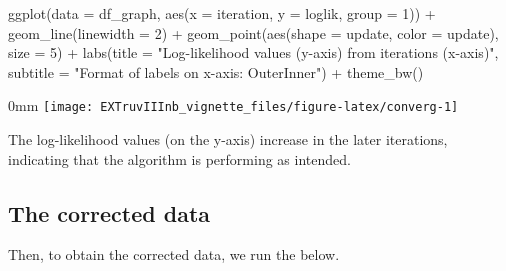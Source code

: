 \documentclass[]{article}
\newcommand{\hlnum}[1]{\textcolor[rgb]{0.816,0.125,0.439}{#1}}%
\newcommand{\hlstr}[1]{\textcolor[rgb]{0.251,0.627,0.251}{#1}}%
\newcommand{\hlstd}[1]{\textcolor[rgb]{0.251,0.251,0.251}{#1}}%
\newenvironment{Shaded}{\begin{myshaded}}{\end{myshaded}}
\newcommand{\DecValTok}[1]{\hlnum{#1}}
\newcommand{\SpecialCharTok}[1]{\hlstr{#1}}
\newcommand{\StringTok}[1]{\hlstr{#1}}
\newcommand{\FunctionTok}[1]{\hlstd{#1}}
\newcommand{\AttributeTok}[1]{{#1}}
\newcommand{\NormalTok}[1]{\hlstd{#1}}
\begin{document}
\begin{Shaded}
\begin{Highlighting}[]
\FunctionTok{ggplot}\NormalTok{(}\AttributeTok{data =}\NormalTok{ df\_graph, }\FunctionTok{aes}\NormalTok{(}\AttributeTok{x =}\NormalTok{ iteration, }\AttributeTok{y =}\NormalTok{ loglik, }\AttributeTok{group =} \DecValTok{1}\NormalTok{)) }\SpecialCharTok{+}
    \FunctionTok{geom\_line}\NormalTok{(}\AttributeTok{linewidth =} \DecValTok{2}\NormalTok{) }\SpecialCharTok{+} \FunctionTok{geom\_point}\NormalTok{(}\FunctionTok{aes}\NormalTok{(}\AttributeTok{shape =}\NormalTok{ update,}
    \AttributeTok{color =}\NormalTok{ update), }\AttributeTok{size =} \DecValTok{5}\NormalTok{) }\SpecialCharTok{+} \FunctionTok{labs}\NormalTok{(}\AttributeTok{title =} \StringTok{"Log{-}likelihood values (y{-}axis) from iterations (x{-}axis)"}\NormalTok{,}
    \AttributeTok{subtitle =} \StringTok{"Format of labels on x{-}axis: OuterInner"}\NormalTok{) }\SpecialCharTok{+} \FunctionTok{theme\_bw}\NormalTok{()}
\end{Highlighting}
\end{Shaded}

\begin{adjustwidth}{\fltoffset}{0mm}
\texttt{[image: EXTruvIIInb\_vignette\_files/figure-latex/converg-1]} \end{adjustwidth}

The log-likelihood values (on the y-axis) increase in the later iterations, indicating that the algorithm is performing as intended.

\subsection{The corrected data}\label{the-corrected-data}

Then, to obtain the corrected data, we run the below.
\end{document}
